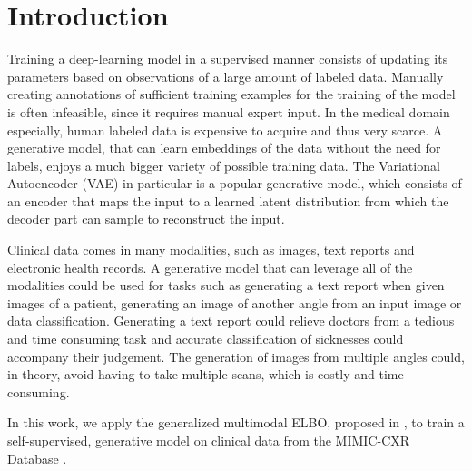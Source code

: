 \section{Introduction}

	Training a deep-learning model in a supervised manner consists of updating its parameters based on observations of a large amount of labeled data.
	Manually creating annotations of sufficient training examples for the training of the model is often infeasible, since it requires manual expert input.
	In the medical domain especially, human labeled data is expensive to acquire and thus very scarce.
	A generative model, that can learn embeddings of the data without the need for labels, enjoys a much bigger variety of possible training data.
	The Variational Autoencoder (VAE) \cite{doersch2016tutorial} in particular is a popular generative model, which consists of an encoder that maps the input to a learned latent distribution from which the decoder part can sample to reconstruct the input.

	Clinical data comes in many modalities, such as images, text reports and electronic health records.
	A generative model that can leverage all of the modalities could be used for tasks such as generating a text report when given images of a patient, generating an image of another angle from an input image or data classification.
	Generating a text report could relieve doctors from a tedious and time consuming task and accurate classification of sicknesses could accompany their judgement.
	The generation of images from multiple angles could, in theory, avoid having to take multiple scans, which is costly and time-consuming.

	In this work, we apply the generalized multimodal ELBO, proposed in \cite{thomas_gener-ELBO}, to train a self-supervised, generative model on clinical data from the MIMIC-CXR Database \cite{johnson2019mimic}.

